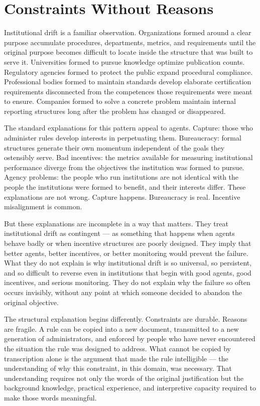 
\section{Constraints Without Reasons}

Institutional drift is a familiar observation. Organizations formed around
a clear purpose accumulate procedures, departments, metrics, and requirements
until the original purpose becomes difficult to locate inside the structure
that was built to serve it. Universities formed to pursue knowledge optimize
publication counts. Regulatory agencies formed to protect the public expand
procedural compliance. Professional bodies formed to maintain standards develop
elaborate certification requirements disconnected from the competences those
requirements were meant to ensure. Companies formed to solve a concrete
problem maintain internal reporting structures long after the problem has
changed or disappeared.

The standard explanations for this pattern appeal to agents. Capture: those
who administer rules develop interests in perpetuating them. Bureaucracy:
formal structures generate their own momentum independent of the goals they
ostensibly serve. Bad incentives: the metrics available for measuring
institutional performance diverge from the objectives the institution was
formed to pursue. Agency problems: the people who run institutions are not
identical with the people the institutions were formed to benefit, and their
interests differ. These explanations are not wrong. Capture happens. Bureaucracy
is real. Incentive misalignment is common.

But these explanations are incomplete in a way that matters. They treat
institutional drift as contingent --- as something that happens when agents
behave badly or when incentive structures are poorly designed. They imply
that better agents, better incentives, or better monitoring would prevent
the failure. What they do not explain is why institutional drift is so
universal, so persistent, and so difficult to reverse even in institutions
that begin with good agents, good incentives, and serious monitoring. They
do not explain why the failure so often occurs invisibly, without any point
at which someone decided to abandon the original objective.

The structural explanation begins differently. Constraints are durable.
Reasons are fragile. A rule can be copied into a new document, transmitted
to a new generation of administrators, and enforced by people who have never
encountered the situation the rule was designed to address. What cannot be
copied by transcription alone is the argument that made the rule intelligible
--- the understanding of why this constraint, in this domain, was necessary.
That understanding requires not only the words of the original justification
but the background knowledge, practical experience, and interpretive capacity
required to make those words meaningful.

